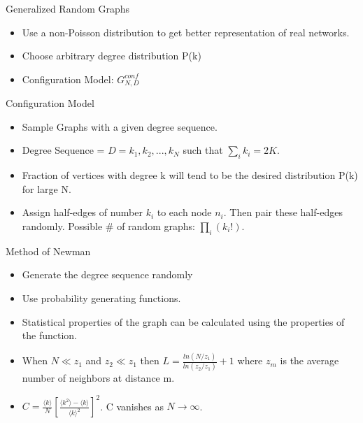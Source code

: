 \documentclass{beamer}
\begin{document}
\begin{frame}{Generalized Random Graphs}

\begin{itemize}
 \item Use a non-Poisson distribution to get better representation of real networks.
 \item Choose arbitrary degree distribution P(k)
 \item Configuration Model: $G^{conf}_{N,D}$
\end{itemize}

\end{frame}


\begin{frame}{Configuration Model}

\begin{itemize}
 \item Sample Graphs with a given degree sequence.
 \item Degree Sequence = $D = {k_1, k_2, ..., k_N}$ such that $\sum_i k_i = 2K$.
 \item Fraction of vertices with degree k will tend to be the desired distribution P(k) for large N.
 \item Assign half-edges of number $k_i$ to each node $n_i$. Then pair these half-edges randomly. Possible \# of random graphs: $\prod_i(k_i!)$.
\end{itemize}

\end{frame}

\begin{frame}{Method of Newman}

\begin{itemize}
 \item Generate the degree sequence randomly
 \item Use probability generating functions.
 \item Statistical properties of the graph can be calculated using the properties of the function.
 \item When $N \ll z_1$ and $z_2 \ll z_1$ then $L = \frac{ln(N/z_1)}{ln(z_2/z_1)} + 1$ where $z_m$ is the average number of neighbors at distance m.
 \item $C = \frac{\langle k \rangle}{N} [\frac{\langle k^2 \rangle - \langle k \rangle}{\langle k \rangle^2}]^2$. C vanishes as $N\rightarrow\infty$.
\end{itemize}

\end{frame}
\end{document}
